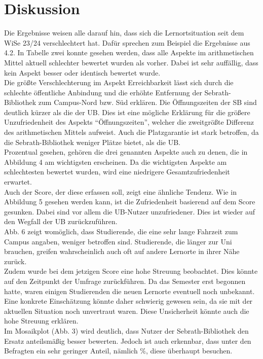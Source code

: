 \documentclass[11pt, a4paper]{article}
\begin{document}
\section{Diskussion}
Die Ergebnisse weisen alle darauf hin, dass sich die Lernortsituation seit dem WiSe 23/24 verschlechtert hat. Dafür sprechen zum Beispiel die Ergebnisse aus 4.2. In Tabelle zwei konnte gesehen werden, dass alle Aspekte im arithmetischen Mittel aktuell schlechter bewertet wurden als vorher. Dabei ist sehr auffällig, dass kein Aspekt besser oder identisch bewertet wurde.\\
Die größte Verschlechterung im Aspekt Erreichbarkeit lässt sich durch die schlechte öffentliche Anbindung und die erhöhte Entfernung der Sebrath-Bibliothek zum Campus-Nord bzw. Süd erklären.  Die Öffnungszeiten der SB sind deutlich kürzer als die der UB. Dies ist eine mögliche Erklärung für die größere Unzufriedenheit des Aspekts “Öffnungszeiten”, welcher die zweitgrößte Differenz des arithmetischen Mittels aufweist. Auch die Platzgarantie ist stark betroffen, da die Sebrath-Bibliothek weniger Plätze bietet, als die UB. \\
Prozentual gesehen, gehören die drei genannten Aspekte auch zu denen, die in Abbildung 4 am wichtigsten erscheinen. Da die wichtigsten Aspekte am schlechtesten bewertet wurden, wird eine niedrigere Gesamtzufriedenheit erwartet.\\
Auch der Score, der diese erfassen soll, zeigt eine ähnliche Tendenz. Wie in Abbildung 5 gesehen werden kann, ist die Zufriedenheit basierend auf dem Score gesunken.
Dabei sind vor allem die UB-Nutzer unzufriedener. Dies ist wieder auf den Wegfall der UB zurückzuführen.\\
Abb. 6 zeigt womöglich, dass Studierende, die eine sehr lange Fahrzeit zum Campus angaben, weniger betroffen sind. Studierende, die länger zur Uni brauchen, greifen wahrscheinlich auch oft auf andere Lernorte in ihrer Nähe zurück. \\
Zudem wurde bei dem jetzigen Score eine hohe Streuung beobachtet. Dies könnte auf den Zeitpunkt der Umfrage zurückführen. Da das Semester erst begonnen hatte, waren einigen Studierenden die neuen Lernorte eventuell noch unbekannt. Eine konkrete Einschätzung könnte daher schwierig gewesen sein, da sie mit der aktuellen Situation noch unvertraut waren. Diese Unsicherheit könnte auch die hohe Streuung erklären.\\
Im Mosaikplot (Abb. 3) wird deutlich, dass Nutzer der Sebrath-Bibliothek den Ersatz anteilsmäßig besser bewerten. Jedoch ist auch erkennbar, dass unter den Befragten ein sehr geringer Anteil, nämlich \%, diese überhaupt besuchen.\\
\end{document}

